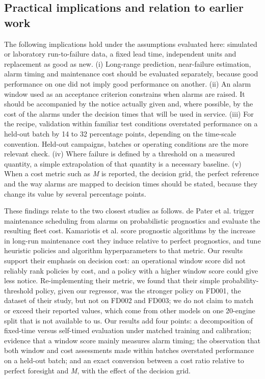 \documentclass[a4paper,fleqn,doubleblind]{cas-dc}
\begin{document}
\subsection{Practical implications and relation to earlier work}

The following implications hold under the assumptions evaluated here: simulated or laboratory run-to-failure data, a fixed lead time, independent units and replacement as good as new. (i) Long-range prediction, near-failure estimation, alarm timing and maintenance cost should be evaluated separately, because good performance on one did not imply good performance on another. (ii) An alarm window used as an acceptance criterion constrains when alarms are raised. It should be accompanied by the notice actually given and, where possible, by the cost of the alarms under the decision times that will be used in service. (iii) For the recipe, validation within familiar test conditions overstated performance on a held-out batch by 14 to 32 percentage points, depending on the time-scale convention. Held-out campaigns, batches or operating conditions are the more relevant check. (iv) Where failure is defined by a threshold on a measured quantity, a simple extrapolation of that quantity is a necessary baseline. (v) When a cost metric such as \textit{M} is reported, the decision grid, the perfect reference and the way alarms are mapped to decision times should be stated, because they change its value by several percentage points.

These findings relate to the two closest studies as follows. de Pater et al. \cite{depater2022} trigger maintenance scheduling from alarms on probabilistic prognostics and evaluate the resulting fleet cost. Kamariotis et al. \cite{kamariotis2024} score prognostic algorithms by the increase in long-run maintenance cost they induce relative to perfect prognostics, and tune heuristic policies and algorithm hyperparameters to that metric. Our results support their emphasis on decision cost: an operational window score did not reliably rank policies by cost, and a policy with a higher window score could give less notice. Re-implementing their metric, we found that their simple probability-threshold policy, given our regressor, was the stronger policy on FD001, the dataset of their study, but not on FD002 and FD003; we do not claim to match or exceed their reported values, which come from other models on one 20-engine split that is not available to us. Our results add four points: a decomposition of fixed-time versus self-timed evaluation under matched training and calibration; evidence that a window score mainly measures alarm timing; the observation that both window and cost assessments made within batches overstated performance on a held-out batch; and an exact conversion between a cost ratio relative to perfect foresight and \textit{M}, with the effect of the decision grid.
\end{document}
